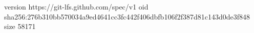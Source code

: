 version https://git-lfs.github.com/spec/v1
oid sha256:276b310bb570034a9ed4641cc3fc442f406dbfb106f2f387d81c143d0de3f848
size 58171
